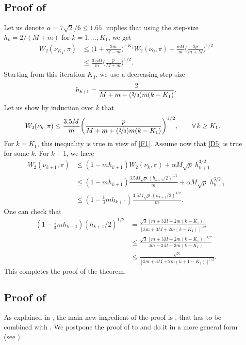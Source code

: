 \documentclass[aoap,preprint,reqno,a4paper]{imsart} %
\begin{document}
\subsection{Proof of }
Let us denote $\alpha = 7\sqrt{2}/6\le 1.65$.
 implies that using the step-size $h_k =2/(M+m)$ for $k=1,\ldots,K_1$, we get
\begin{align}
W_2(\nu_{K_1},\pi)
		&\le \Big(1+\frac{2m}{M-m}\Big)^{-K_1} W_2(\nu_0,\pi) +
			\frac{\alpha M}{m}\Big(\frac{2p}{m+M}\Big)^{1/2}\\
		&\le \frac{3.5M}{m}\Big(\frac{p}{M+m}\Big)^{1/2}.\label{F1}
\end{align}
Starting from this iteration $K_1$, we use a decreasing step-size
\begin{align}\label{H1}
h_{k+1}  = \frac{2}{M+m+(\nicefrac23)m(k-K_1)}.
\end{align}
Let us show by induction over $k$ that
\begin{align}
W_2(\nu_k,\pi)
		&\le \frac{3.5M}{m}\bigg(\frac{p}{M+m+(\nicefrac23)m(k-K_1)}\bigg)^{1/2},\qquad \forall\,k\ge K_1.\label{D5}
\end{align}
For $k=K_1$, this inequality is true in view of \eqref{F1}. Assume now that \eqref{D5}  is true for some $k$.
For $k+1$, we have
\begin{align}
W_2(\nu_{k+1},\pi)
	& \le (1-mh_{k+1}) W_2(\nu_{k},\pi) + \alpha M\sqrt{p}\; h_{k+1}^{3/2}\\
	& \le (1-mh_{k+1}) \frac{3.5M\sqrt{p}\, (h_{k+1}/2)^{1/2}}{m} + \alpha M\sqrt{p}\; h_{k+1}^{3/2}\\
	& \le (1-\frac13mh_{k+1}) \frac{3.5M\sqrt{p}\, (h_{k+1}/2)^{1/2}}{m}.
\end{align}
One can check that
\begin{align}
(1-\frac13mh_{k+1})(h_{k+1}/2)^{1/2}
		& = \frac{\sqrt{3}\,[m+3M+2m(k-K_1)]}{[3m+3M+2m(k-K_1)]^{3/2}} \\
		& \le \frac{\sqrt{3}\,[m+3M+2m(k-K_1)]^{1/2}}{3m+3M+2m(k-K_1)} \\
		& \le \frac{\sqrt{3}}{[3m+3M+2m(k+1-K_1)]^{1/2}}.
\end{align}
This completes the proof of the theorem.


\subsection{Proof of }

As explained in , the main new ingredient of the proof is
, that has to be combined with . We postpone the proof
of  to  and do it in a more general form (see ).
\end{document}
